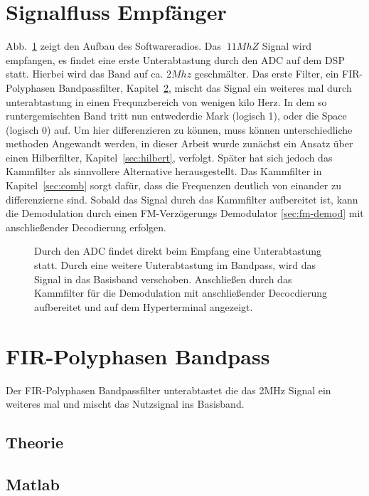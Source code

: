 \documentclass{article}
\begin{document}
\section{Signalfluss Empfänger}

Abb.~\ref{fig:signal} zeigt den Aufbau des Softwareradios. Das $~11MhZ$ Signal wird empfangen, es findet eine erste Unterabtastung durch den ADC auf dem DSP statt.
Hierbei wird das Band auf ca. $2Mhz$ geschmälter. Das erste Filter, ein FIR-Polyphasen Bandpassfilter, Kapitel~\ref{sec:FIR}, mischt das Signal ein weiteres mal durch unterabtastung in einen Frequnzbereich
von wenigen kilo Herz. In dem so runtergemischten Band tritt nun entwederdie Mark (logisch 1), oder die Space (logisch 0) auf. Um hier differenzieren zu können,
muss können unterschiedliche methoden Angewandt werden, in dieser Arbeit wurde zunächst ein Ansatz über einen Hilberfilter, Kapitel~\ref{sec:hilbert}, verfolgt. Später hat sich jedoch das Kammfilter
als sinnvollere Alternative herausgestellt. Das Kammfilter in Kapitel~\ref{sec:comb} sorgt dafür, dass die Frequenzen deutlich von einander zu differenzierne sind. Sobald das Signal durch das Kammfilter
aufbereitet ist, kann die Demodulation durch einen FM-Verzögerungs Demodulator \ref{sec:fm-demod} mit anschließender Decodierung erfolgen.

\begin{figure}[!h]
    \centering
    \def\svgscale{0.5}
    \def\svgwidth{\columnwidth}
    
    \caption{Durch den ADC findet direkt beim Empfang eine Unterabtastung statt. Durch eine weitere Unterabtastung im Bandpass, wird das Signal in das Basisband verschoben.
    Anschließen durch das Kammfilter für die Demodulation mit anschließender Decocdierung aufbereitet und auf dem Hyperterminal angezeigt.}
    \label{fig:signal}
\end{figure}

\section{FIR-Polyphasen Bandpass}\label{sec:FIR}
Der FIR-Polyphasen Bandpassfilter unterabtastet die das 2MHz Signal ein weiteres mal und mischt 
das Nutzsignal ins Basisband.

\subsection{Theorie}

\subsection{Matlab}
\end{document}
